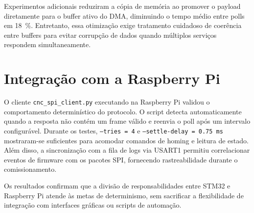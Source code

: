 Experimentos adicionais reduziram a cópia de memória ao promover o
payload diretamente para o buffer ativo do DMA, diminuindo o tempo médio
entre polls em \SI{18}{\percent}. Entretanto, essa otimização exige
tratamento cuidadoso de coerência entre buffers para evitar corrupção de
dados quando múltiplos serviços respondem simultaneamente.

\section{Integração com a Raspberry Pi}

O cliente \texttt{cnc\_spi\_client.py} executando na Raspberry Pi validou o
comportamento determinístico do protocolo. O script detecta automaticamente
quando a resposta não contém um frame válido e reenvia o poll após um
intervalo configurável. Durante os testes, \texttt{--tries = 4} e
\texttt{--settle-delay = 0.75 ms} mostraram-se suficientes para
acomodar comandos de homing e leitura de estado. Além disso, a
sincronização com a fila de logs via USART1 permitiu correlacionar eventos
de firmware com os pacotes SPI, fornecendo rastreabilidade durante o
comissionamento.

Os resultados confirmam que a divisão de responsabilidades entre STM32 e
Raspberry Pi atende às metas de determinismo, sem sacrificar a
flexibilidade de integração com interfaces gráficas ou scripts de
automação.

